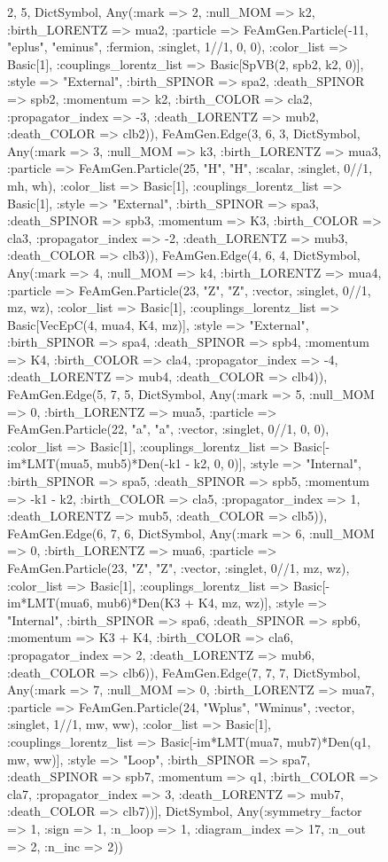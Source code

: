 \documentclass{revtex4}
\begin{document}
\begin{figure}[!htb]
\begin{center}
{2, 5, Dict{Symbol, Any}(:mark => 2, :null_MOM => k2, :birth_LORENTZ => mua2, :particle => FeAmGen.Particle(-11, "eplus", "eminus", :fermion, :singlet, 1//1, 0, 0), :color_list => Basic[1], :couplings_lorentz_list => Basic[SpVB(2, spb2, k2, 0)], :style => "External", :birth_SPINOR => spa2, :death_SPINOR => spb2, :momentum => k2, :birth_COLOR => cla2, :propagator_index => -3, :death_LORENTZ => mub2, :death_COLOR => clb2)), FeAmGen.Edge(3, 6, 3, Dict{Symbol, Any}(:mark => 3, :null_MOM => k3, :birth_LORENTZ => mua3, :particle => FeAmGen.Particle(25, "H", "H", :scalar, :singlet, 0//1, mh, wh), :color_list => Basic[1], :couplings_lorentz_list => Basic[1], :style => "External", :birth_SPINOR => spa3, :death_SPINOR => spb3, :momentum => K3, :birth_COLOR => cla3, :propagator_index => -2, :death_LORENTZ => mub3, :death_COLOR => clb3)), FeAmGen.Edge(4, 6, 4, Dict{Symbol, Any}(:mark => 4, :null_MOM => k4, :birth_LORENTZ => mua4, :particle => FeAmGen.Particle(23, "Z", "Z", :vector, :singlet, 0//1, mz, wz), :color_list => Basic[1], :couplings_lorentz_list => Basic[VecEpC(4, mua4, K4, mz)], :style => "External", :birth_SPINOR => spa4, :death_SPINOR => spb4, :momentum => K4, :birth_COLOR => cla4, :propagator_index => -4, :death_LORENTZ => mub4, :death_COLOR => clb4)), FeAmGen.Edge(5, 7, 5, Dict{Symbol, Any}(:mark => 5, :null_MOM => 0, :birth_LORENTZ => mua5, :particle => FeAmGen.Particle(22, "a", "a", :vector, :singlet, 0//1, 0, 0), :color_list => Basic[1], :couplings_lorentz_list => Basic[-im*LMT(mua5, mub5)*Den(-k1 - k2, 0, 0)], :style => "Internal", :birth_SPINOR => spa5, :death_SPINOR => spb5, :momentum => -k1 - k2, :birth_COLOR => cla5, :propagator_index => 1, :death_LORENTZ => mub5, :death_COLOR => clb5)), FeAmGen.Edge(6, 7, 6, Dict{Symbol, Any}(:mark => 6, :null_MOM => 0, :birth_LORENTZ => mua6, :particle => FeAmGen.Particle(23, "Z", "Z", :vector, :singlet, 0//1, mz, wz), :color_list => Basic[1], :couplings_lorentz_list => Basic[-im*LMT(mua6, mub6)*Den(K3 + K4, mz, wz)], :style => "Internal", :birth_SPINOR => spa6, :death_SPINOR => spb6, :momentum => K3 + K4, :birth_COLOR => cla6, :propagator_index => 2, :death_LORENTZ => mub6, :death_COLOR => clb6)), FeAmGen.Edge(7, 7, 7, Dict{Symbol, Any}(:mark => 7, :null_MOM => 0, :birth_LORENTZ => mua7, :particle => FeAmGen.Particle(24, "Wplus", "Wminus", :vector, :singlet, 1//1, mw, ww), :color_list => Basic[1], :couplings_lorentz_list => Basic[-im*LMT(mua7, mub7)*Den(q1, mw, ww)], :style => "Loop", :birth_SPINOR => spa7, :death_SPINOR => spb7, :momentum => q1, :birth_COLOR => cla7, :propagator_index => 3, :death_LORENTZ => mub7, :death_COLOR => clb7))], Dict{Symbol, Any}(:symmetry_factor => 1, :sign => 1, :n_loop => 1, :diagram_index => 17, :n_out => 2, :n_inc => 2)) 
}
\end{center}
\end{figure}
\end{document}

